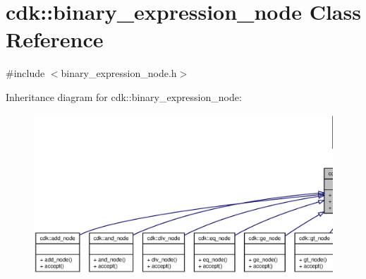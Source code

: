 \section{cdk\+:\+:binary\+\_\+expression\+\_\+node Class Reference}
\label{classcdk_1_1binary__expression__node}


{\ttfamily \#include $<$binary\+\_\+expression\+\_\+node.\+h$>$}



Inheritance diagram for cdk\+:\+:binary\+\_\+expression\+\_\+node\+:
\nopagebreak
\begin{figure}[H]
\begin{center}
\leavevmode
\includegraphics[width=350pt]{classcdk_1_1binary__expression__node__inherit__graph}
\end{center}
\end{figure}


